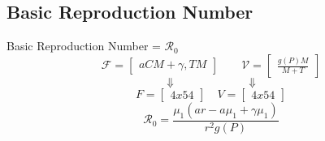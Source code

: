 \documentclass{beamer}
\begin{document}
\subsection{Basic Reproduction Number}
\begin{frame}{Basic Reproduction Number = $\mathscr{R}_{0}$}
    $$\mathscr{F} = \begin{bmatrix} aCM+\gamma,TM \end{bmatrix} \quad \quad \mathscr{V} = \begin{bmatrix} \frac{g(P)M}{M+T} \end{bmatrix}$$
    $$\Downarrow \quad \quad \quad \quad \quad \quad \Downarrow$$
    $$F = \begin{bmatrix} 4x54 \end{bmatrix} \quad V = \begin{bmatrix} 4x54 \end{bmatrix}$$
    $$\displaystyle {\mathscr{R}}_{0} = \frac{\mu_{1}(a r - a\mu_{1} + \gamma \mu_{1})}{r^{2}g(P)}$$
\end{frame}



\end{document}
